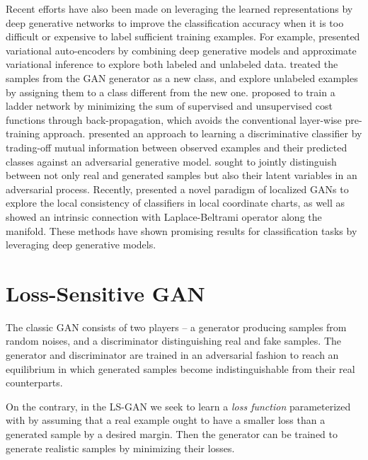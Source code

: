 \documentclass[11pt,fullpage, letterpaper,twoside]{article}
\newcommand{\1}[1]{\mathds{1}_{\left[#1\right]}}
\begin{document}
Recent efforts have also been made on leveraging the learned representations by deep generative networks to improve the classification accuracy when it is too difficult or expensive to label sufficient training examples.  For example, \cite{kingma2014semi} presented variational auto-encoders \cite{kingma2013auto} by combining deep generative models and approximate variational inference to explore both labeled and unlabeled data.
\cite{salimans2016improved} treated the samples from the GAN generator as a new class, and explore unlabeled examples by assigning them to a class different from the new one. \cite{rasmus2015semi} proposed to train a ladder network \cite{valpola2015neural} by minimizing the sum of supervised and unsupervised cost functions through back-propagation, which avoids the conventional layer-wise pre-training approach. \cite{springenberg2015unsupervised} presented an approach to learning a discriminative classifier by trading-off mutual information between observed examples and their predicted classes against an adversarial generative model. \cite{dumoulin2016adversarially} sought to jointly distinguish between not only real and generated samples but also their latent variables in an adversarial process. Recently, \cite{qi2017global} presented a novel paradigm of localized GANs to explore the local consistency of classifiers in local coordinate charts, as well as showed an intrinsic connection with Laplace-Beltrami operator along the manifold. These methods have shown promising results for classification tasks by leveraging deep generative models.





\section{Loss-Sensitive GAN}\label{sec:lsgan}
The classic GAN consists of two players -- a generator producing samples from random noises,
and a discriminator distinguishing real and fake samples. The generator and discriminator are trained in an adversarial fashion to reach an equilibrium in which generated samples become indistinguishable from their real counterparts.



On the contrary, in the LS-GAN we seek to learn a {\em loss function}  parameterized with  by assuming that a real example ought to have a smaller loss than a generated sample by a desired margin. Then the generator
can be trained to generate realistic samples by minimizing their losses.
\end{document}
